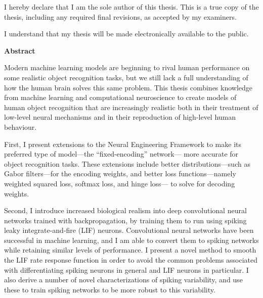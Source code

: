 \cleardoublepage

{}

\noindent
I hereby declare that I am the sole author of this thesis.
This is a true copy of the thesis, including any required final revisions,
as accepted by my examiners.

  \bigskip

\noindent
I understand that my thesis will be made electronically available to the public.

\cleardoublepage


\begin{center}\textbf{Abstract}\end{center}

\noindent
Modern machine learning models are beginning to rival human performance
on some realistic object recognition tasks,
but we still lack a full understanding
of how the human brain solves this same problem.
This thesis combines knowledge from machine learning and computational neuroscience
to create models of human object recognition
that are increasingly realistic
both in their treatment of low-level neural mechanisms
and in their reproduction of high-level human behaviour.

First, I present extensions to the Neural Engineering Framework
to make its preferred type of model---the ``fixed-encoding'' network---%
more accurate for object recognition tasks.
These extensions include better distributions---such as Gabor filters---for the encoding weights,
and better loss functions---namely weighted squared loss, softmax loss, and hinge loss---%
to solve for decoding weights.

Second, I introduce increased biological realism into
deep convolutional neural networks trained with backpropagation,
by training them to run using spiking leaky integrate-and-fire (LIF) neurons.
Convolutional neural networks have been successful in machine learning,
and I am able to convert them to spiking networks
while retaining similar levels of performance.
I present a novel method to smooth the LIF rate response function
in order to avoid the common problems associated with differentiating
spiking neurons in general and LIF neurons in particular.
I also derive a number of novel characterizations of spiking variability,
and use these to train spiking networks to be more robust to this variability.

